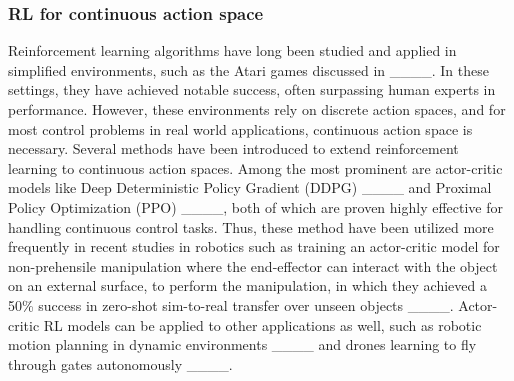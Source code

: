 \subsubsection{\textbf{RL for continuous action space}} Reinforcement learning algorithms have long been studied and applied in simplified environments, such as the Atari games discussed in ____. In these settings, they have achieved notable success, often surpassing human experts in performance. However, these environments rely on discrete action spaces, and for most control problems in real world applications, continuous action space is necessary. Several methods have been introduced to extend reinforcement learning to continuous action spaces. Among the most prominent are actor-critic models like Deep Deterministic Policy Gradient (DDPG) ____ and Proximal Policy Optimization (PPO) ____, both of which are proven highly effective for handling continuous control tasks. Thus, these method have been utilized more frequently in recent studies in robotics such as training an actor-critic model for non-prehensile manipulation where the end-effector can interact with the object on an external surface, to perform the manipulation, in which they achieved a 50\% success in zero-shot sim-to-real transfer over unseen objects ____.
Actor-critic RL models can be applied to other applications as well, such as robotic motion planning in dynamic environments ____ and drones learning to fly through gates autonomously ____.
